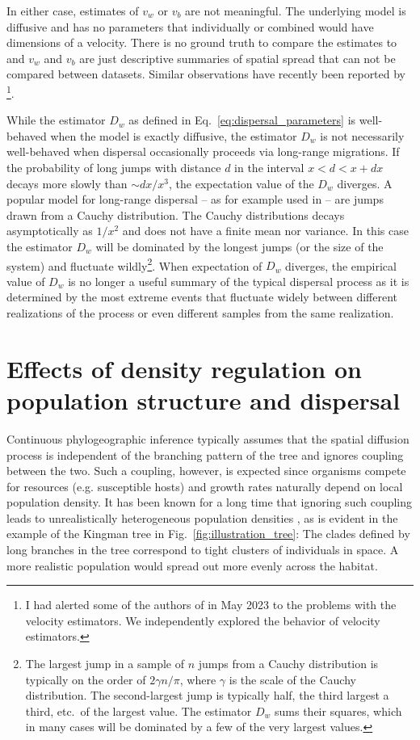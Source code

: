 \documentclass[aps,rmp, twocolumn]{revtex4}
\begin{document}
In either case, estimates of $v_w$ or $v_b$ are not meaningful.
The underlying model is diffusive and has no parameters that individually or combined would have dimensions of a velocity.
There is no ground truth to compare the estimates to and $v_w$ and $v_b$ are just descriptive summaries of spatial spread that can not be compared between datasets.
Similar observations have recently been reported by \citet{dellicour_how_2024}\footnote{I had alerted some of the authors of \citep{dellicour_how_2024} in May 2023 to the problems with the velocity estimators. We independently explored the behavior of velocity estimators.}.

While the estimator $D_w$ as defined in Eq.~\ref{eq:dispersal_parameters} is well-behaved when the model is exactly diffusive, the estimator $D_w$ is not necessarily well-behaved when dispersal occasionally proceeds via long-range migrations.
If the probability of long jumps with distance $d$ in the interval $x<d<x+dx$ decays more slowly than $\sim dx/x^3$, the expectation value of the $D_w$ diverges.
A popular model for long-range dispersal -- as for example used in \citet{dellicour_how_2024} -- are jumps drawn from a Cauchy distribution.
The Cauchy distributions decays asymptotically as $1/x^2$ and does not have a finite mean nor variance.
In this case the estimator $D_w$ will be dominated by the longest jumps (or the size of the system) and fluctuate wildly\footnote{The largest jump in a sample of $n$ jumps from a Cauchy distribution is typically on the order of $2\gamma n/\pi$, where $\gamma$ is the scale of the Cauchy distribution. The second-largest jump is typically half, the third largest a third, etc.~of the largest value. The estimator $D_w$ sums their squares, which in many cases will be dominated by a few of the very largest values. }.
When expectation of $D_w$ diverges, the empirical value of $D_w$ is no longer a useful summary of the typical dispersal process as it is determined by the most extreme events that fluctuate widely between different realizations of the process or even different samples from the same realization.



\section*{Effects of density regulation on population structure and dispersal}
Continuous phylogeographic inference typically assumes that the spatial diffusion process is independent of the branching pattern of the tree and ignores coupling between the two.
Such a coupling, however, is expected since organisms compete for resources (e.g. susceptible hosts) and growth rates naturally depend on local population density.
It has been known for a long time that ignoring such coupling leads to unrealistically heterogeneous population densities \citep{felsenstein_pain_1975}, as is evident in the example of the Kingman tree in Fig.~\ref{fig:illustration_tree}:
The clades defined by long branches in the tree correspond to tight clusters of individuals in space.
A more realistic population would spread out more evenly across the habitat.
\end{document}
